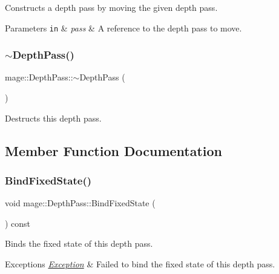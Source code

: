 Constructs a depth pass by moving the given depth pass.


\begin{DoxyParams}[1]{Parameters}
\mbox{\tt in}  & {\em pass} & A reference to the depth pass to move. \\
\hline
\end{DoxyParams}
\hypertarget{classmage_1_1_depth_pass_adc89d5da94b42294316d4ad1dfa09eb4}{}\label{classmage_1_1_depth_pass_adc89d5da94b42294316d4ad1dfa09eb4} 
\subsubsection{\texorpdfstring{$\sim$\+Depth\+Pass()}{~DepthPass()}}
{\footnotesize\ttfamily mage\+::\+Depth\+Pass\+::$\sim$\+Depth\+Pass (\begin{DoxyParamCaption}{ }\end{DoxyParamCaption})\hspace{0.3cm}{\ttfamily [default]}}

Destructs this depth pass. 

\subsection{Member Function Documentation}
\hypertarget{classmage_1_1_depth_pass_a9fb46d9ce430864284bb35091855f7ed}{}\label{classmage_1_1_depth_pass_a9fb46d9ce430864284bb35091855f7ed} 
\subsubsection{\texorpdfstring{Bind\+Fixed\+State()}{BindFixedState()}}
{\footnotesize\ttfamily void mage\+::\+Depth\+Pass\+::\+Bind\+Fixed\+State (\begin{DoxyParamCaption}{ }\end{DoxyParamCaption}) const\hspace{0.3cm}{\ttfamily [noexcept]}}

Binds the fixed state of this depth pass.


\begin{DoxyExceptions}{Exceptions}
{\em \hyperlink{classmage_1_1_exception}{Exception}} & Failed to bind the fixed state of this depth pass. \\
\hline
\end{DoxyExceptions}
\hypertarget{classmage_1_1_depth_pass_a674fc5fe2e8cae4c704a554dc8bc1fdd}{}\label{classmage_1_1_depth_pass_a674fc5fe2e8cae4c704a554dc8bc1fdd} 
